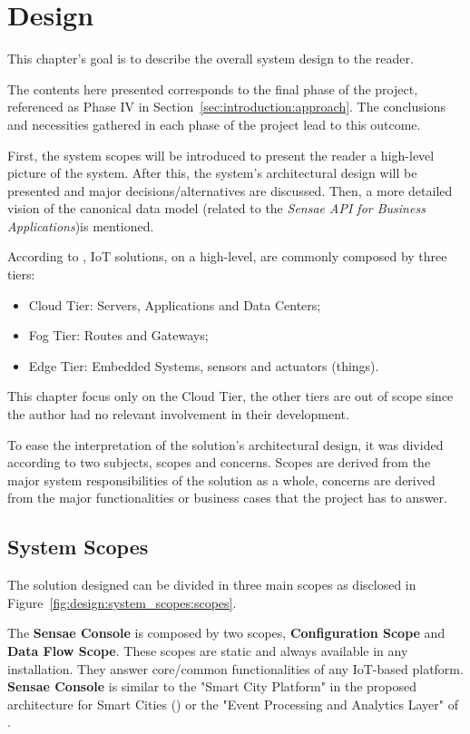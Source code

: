 \chapter{Design}
\label{chap:design}

This chapter's goal is to describe the overall system design to the reader.

The contents here presented corresponds to the final phase of the project, referenced as Phase IV in Section~\ref{sec:introduction:approach}. The conclusions and necessities gathered in each phase of the project lead to this outcome. 

First, the system scopes will be introduced to present the reader a high-level picture of the system. After this, the system's architectural design will be presented and major decisions/alternatives are discussed. Then, a more detailed vision of the canonical data model (related to the \textit{Sensae API for Business Applications})is mentioned.

According to \cite{DIAS2022100529}, \gls{IoT} solutions, on a high-level, are commonly composed by three tiers:

\begin{itemize}
   \item Cloud Tier: Servers, Applications and Data Centers;
   \item Fog Tier: Routes and Gateways;
   \item Edge Tier: Embedded Systems, sensors and actuators (things).
\end{itemize}

This chapter focus only on the Cloud Tier, the other tiers are out of scope since the author had no relevant involvement in their development.

To ease the interpretation of the solution's architectural design, it was divided according to two subjects, scopes and concerns.
Scopes are derived from the major system responsibilities of the solution as a whole, concerns are derived from the major functionalities or business cases that the project has to answer.

\section{System Scopes}
\label{sec:design:system_scopes}

The solution designed can be divided in three main scopes as disclosed in Figure~\ref{fig:design:system_scopes:scopes}.

The \textbf{Sensae Console} is composed by two scopes, \textbf{Configuration Scope} and \textbf{Data Flow Scope}. These scopes are static and always available in any installation. They answer core/common functionalities of any \gls{IoT}-based platform. \textbf{Sensae Console} is similar to the "Smart City Platform" in the proposed architecture for Smart Cities () or the "Event Processing and Analytics Layer" of .

